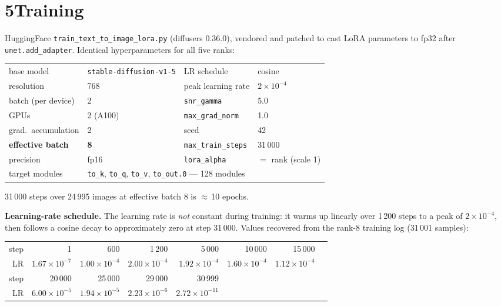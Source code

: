 \documentclass[11pt,a4paper]{article}
\begin{document}
\section*{5\quad Training}

HuggingFace \texttt{train\_text\_to\_image\_lora.py} (diffusers 0.36.0), vendored
and patched to cast LoRA parameters to fp32 after \texttt{unet.add\_adapter}.
Identical hyperparameters for all five ranks:

\begin{center}\small
\begin{tabular}{ll@{\qquad}ll}
\toprule
base model & \texttt{stable-diffusion-v1-5} & LR schedule & cosine \\
resolution & 768 & peak learning rate & $2\times10^{-4}$ \\
batch (per device) & 2 & \texttt{snr\_gamma} & 5.0 \\
GPUs & 2 (A100) & \texttt{max\_grad\_norm} & 1.0 \\
grad.\ accumulation & 2 & seed & 42 \\
\textbf{effective batch} & \textbf{8} & \texttt{max\_train\_steps} & 31\,000 \\
precision & fp16 & \texttt{lora\_alpha} & $=$ rank (scale 1) \\
target modules & \multicolumn{3}{l}{\texttt{to\_k}, \texttt{to\_q}, \texttt{to\_v}, \texttt{to\_out.0} --- 128 modules} \\
\bottomrule
\end{tabular}
\end{center}

31\,000 steps over 24\,995 images at effective batch 8 is $\approx$\,10 epochs.

\textbf{Learning-rate schedule.} The learning rate is \emph{not} constant during
training: it warms up linearly over 1\,200 steps to a peak of $2\times10^{-4}$,
then follows a cosine decay to approximately zero at step 31\,000. Values
recovered from the rank-8 training log (31\,001 samples):

\begin{center}\small
\begin{tabular}{rrrrrrrr}
\toprule
step & 1 & 600 & 1\,200 & 5\,000 & 10\,000 & 15\,000 \\
LR & $1.67\!\times\!10^{-7}$ & $1.00\!\times\!10^{-4}$ & $2.00\!\times\!10^{-4}$ & $1.92\!\times\!10^{-4}$ & $1.60\!\times\!10^{-4}$ & $1.12\!\times\!10^{-4}$ \\
\midrule
step & 20\,000 & 25\,000 & 29\,000 & 30\,999 & & \\
LR & $6.00\!\times\!10^{-5}$ & $1.94\!\times\!10^{-5}$ & $2.23\!\times\!10^{-6}$ & $2.72\!\times\!10^{-11}$ & & \\
\bottomrule
\end{tabular}
\end{center}
\end{document}
